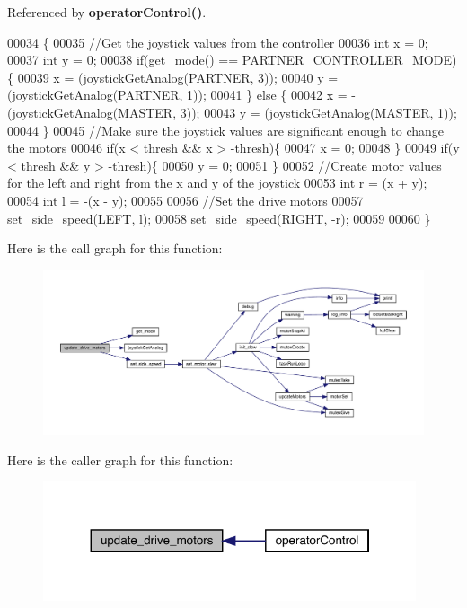 Referenced by \textbf{ operator\+Control()}.


\begin{DoxyCode}
00034                           \{
00035   \textcolor{comment}{//Get the joystick values from the controller}
00036   \textcolor{keywordtype}{int} x = 0;
00037   \textcolor{keywordtype}{int} y = 0;
00038   \textcolor{keywordflow}{if}(get_mode() == PARTNER_CONTROLLER_MODE) \{
00039     x = (joystickGetAnalog(PARTNER, 3));
00040     y = (joystickGetAnalog(PARTNER, 1));
00041   \} \textcolor{keywordflow}{else} \{
00042     x = -(joystickGetAnalog(MASTER, 3));
00043     y = (joystickGetAnalog(MASTER, 1));
00044   \}
00045   \textcolor{comment}{//Make sure the joystick values are significant enough to change the motors}
00046   \textcolor{keywordflow}{if}(x < thresh && x > -thresh)\{
00047     x = 0;
00048   \}
00049   \textcolor{keywordflow}{if}(y < thresh && y > -thresh)\{
00050     y = 0;
00051   \}
00052   \textcolor{comment}{//Create motor values for the left and right from the x and y of the joystick}
00053   \textcolor{keywordtype}{int} r = (x + y);
00054   \textcolor{keywordtype}{int} l = -(x - y);
00055 
00056   \textcolor{comment}{//Set the drive motors}
00057   set_side_speed(LEFT, l);
00058   set_side_speed(RIGHT, -r);
00059 
00060 \}
\end{DoxyCode}
Here is the call graph for this function\+:\nopagebreak
\begin{figure}[H]
\begin{center}
\leavevmode
\includegraphics[width=350pt]{drive_8h_a8224a4626a934d30ed587671b7004bf8_cgraph}
\end{center}
\end{figure}
Here is the caller graph for this function\+:\nopagebreak
\begin{figure}[H]
\begin{center}
\leavevmode
\includegraphics[width=311pt]{drive_8h_a8224a4626a934d30ed587671b7004bf8_icgraph}
\end{center}
\end{figure}
